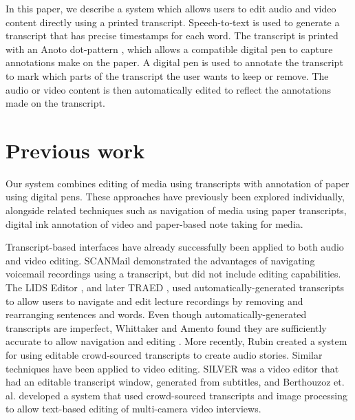 In this paper, we describe a system which allows users to edit audio and video
content directly using a printed transcript.  Speech-to-text is used to
generate a transcript that has precise timestamps for each word.  The
transcript is printed with an Anoto dot-pattern \citep{Fahraeus2003}, which
allows a compatible digital pen to capture annotations make on the paper.  A
digital pen is used to annotate the transcript to mark which parts of the
transcript the user wants to keep or remove.  The audio or video content is
then automatically edited to reflect the annotations made on the transcript.




\section{Previous work}
Our system combines editing of media using transcripts with annotation of paper
using digital pens. These approaches have previously been explored
individually, alongside related techniques such as navigation of media using
paper transcripts, digital ink annotation of video and paper-based note taking
for media.

Transcript-based interfaces have already successfully been applied to both audio
and video editing. SCANMail \citep{Whittaker2002} demonstrated the advantages of
navigating voicemail recordings using a transcript, but did not include editing
capabilities.  The LIDS Editor \citep{Apperley2002}, and later TRAED
\citep{Masoodian2006}, used automatically-generated transcripts to allow users
to navigate and edit lecture recordings by removing and rearranging sentences
and words. Even though automatically-generated transcripts are
imperfect, Whittaker and Amento found they are sufficiently accurate to allow
navigation and editing \citep{Whittaker2004}.  More recently, Rubin
\citep{Rubin2013} created a system for using editable crowd-sourced transcripts
to create audio stories.  Similar techniques have been applied to video
editing. SILVER \citep{Casares2002} was a video editor that had an editable
transcript window, generated from subtitles, and Berthouzoz et. al.
\citep{Berthouzoz2012} developed a system that used crowd-sourced transcripts and
image processing to allow text-based editing of multi-camera video interviews.

